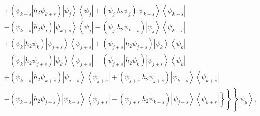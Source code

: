 \documentclass[aps,preprint]{revtex4}%
\begin{document}
\begin{align}
&  +\left(  \left.  \psi_{k+s}\right\vert h_{2}\psi_{k+s}\right)  \left\vert
\psi_{j}\right\rangle \left\langle \psi_{j}\right\vert +\left(  \left.
\psi_{j}\right\vert h_{2}\psi_{j}\right)  \left\vert \psi_{k+s}\right\rangle
\left\langle \psi_{k+s}\right\vert \nonumber\\
&  -\left(  \left.  \psi_{k+s}\right\vert h_{2}\psi_{j}\right)  \left\vert
\psi_{k+s}\right\rangle \left\langle \psi_{j}\right\vert -\left(  \left.
\psi_{j}\right\vert h_{2}\psi_{k+s}\right)  \left\vert \psi_{j}\right\rangle
\left\langle \psi_{k+s}\right\vert \nonumber\\
&  +\left(  \left.  \psi_{k}\right\vert h_{2}\psi_{k}\right)  \left\vert
\psi_{j+s}\right\rangle \left\langle \psi_{j+s}\right\vert +\left(  \left.
\psi_{j+s}\right\vert h_{2}\psi_{j+s}\right)  \left\vert \psi_{k}\right\rangle
\left\langle \psi_{k}\right\vert \nonumber\\
&  -\left(  \left.  \psi_{k}\right\vert h_{2}\psi_{j+s}\right)  \left\vert
\psi_{k}\right\rangle \left\langle \psi_{j+s}\right\vert -\left(  \left.
\psi_{j+s}\right\vert h_{2}\psi_{k}\right)  \left\vert \psi_{j+s}\right\rangle
\left\langle \psi_{k}\right\vert \nonumber\\
&  +\left(  \left.  \psi_{k+s}\right\vert h_{2}\psi_{k+s}\right)  \left\vert
\psi_{j+s}\right\rangle \left\langle \psi_{j+s}\right\vert +\left(  \left.
\psi_{j+s}\right\vert h_{2}\psi_{j+s}\right)  \left\vert \psi_{k+s}%
\right\rangle \left\langle \psi_{k+s}\right\vert \nonumber\\
&  -\left.  \overset{}{\left.  \overset{}{\left.  \left(  \left.  \psi
_{k+s}\right\vert h_{2}\psi_{j+s}\right)  \left\vert \psi_{k+s}\right\rangle
\left\langle \psi_{j+s}\right\vert -\left(  \left.  \psi_{j+s}\right\vert
h_{2}\psi_{k+s}\right)  \left\vert \psi_{j+s}\right\rangle \left\langle
\psi_{k+s}\right\vert \right\}  }\right\}  }\right\}  \left\vert \psi_{\mu
}\right\rangle ,
\end{align}
%
\end{document}
